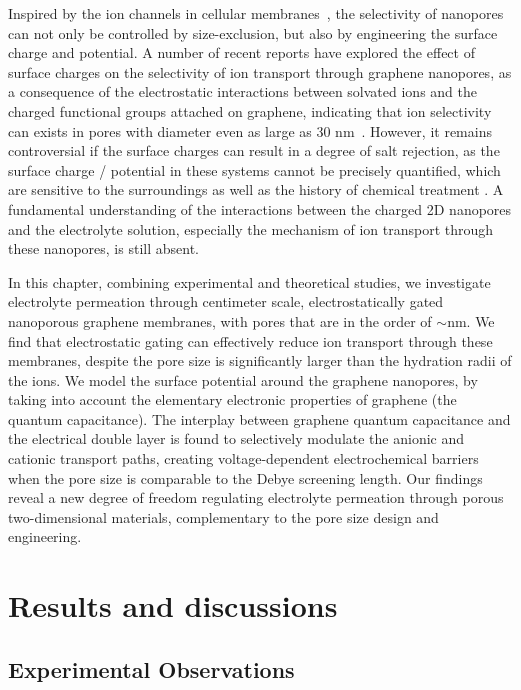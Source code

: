 Inspired by the ion channels in cellular
membranes~\autocite{Chung_2007_biological_ion_chan}, the selectivity of
nanopores can not only be controlled by size-exclusion, but also by
engineering the surface charge and potential.
%
A number of recent reports have explored the effect of surface charges
on the selectivity of ion transport through graphene nanopores, as a
consequence of the electrostatic interactions between solvated ions
and the charged functional groups attached on graphene, indicating
that ion selectivity can exists in pores with diameter even as large
as 30 nm~\autocite{Rollings_2016_gating,Surwade_2014_carbon_electrochemical_ion}.
%
However, it remains controversial if the surface charges can result in
a degree of salt rejection, as the surface charge / potential in these systems
cannot be precisely quantified, which are sensitive to the surroundings
as well as the history of chemical treatment
\autocite{Li_2008_gr_suspension}.
%
A fundamental understanding of the interactions between the charged 2D
nanopores and the electrolyte solution, especially the mechanism of
ion transport through these nanopores, is still absent.

In this chapter, combining experimental and theoretical studies, we
investigate electrolyte permeation through centimeter scale,
electrostatically gated nanoporous graphene membranes, with pores that
are in the order of $\sim{}$\unit[20]{nm}.
%
We find that electrostatic gating can effectively reduce ion transport
through these membranes, despite the pore size is significantly larger
than the hydration radii of the ions. We model the surface potential
around the graphene nanopores, by taking into account the elementary
electronic properties of graphene (\eg the quantum capacitance).
%
The interplay between graphene quantum capacitance and the electrical
double layer is found to selectively modulate the anionic and cationic
transport paths, creating voltage-dependent electrochemical barriers
when the pore size is comparable to the Debye screening length. Our findings
reveal a new degree of freedom regulating electrolyte permeation
through porous two-dimensional materials, complementary to the pore
size design and engineering.

\section{Results and discussions}
\label{sec:np-np-res}

\subsection{Experimental Observations}
\label{sec:np-np-exper-observ}

